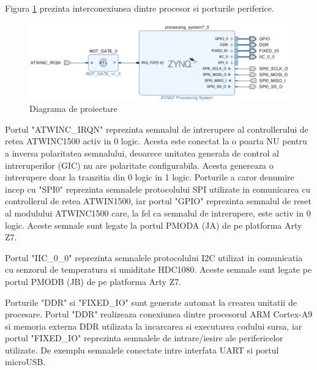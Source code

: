 Figura \ref{fig:PI_ZynqBlockDesign} prezinta interconexiunea dintre procesor si porturile periferice.
\begin{figure}[H]
    \centering
    \includegraphics[scale=0.68]{figs/PI_ZynqBlockDesign.png}
    \caption{Diagrama de proiectare}
    \label{fig:PI_ZynqBlockDesign}
\end{figure}

Portul "ATWINC\_IRQN" reprezinta semnalul de intrerupere al controllerului de retea ATWINC1500 activ in 0 logic. Acesta este conectat la o poarta NU pentru a 
inversa polaritatea semnalului, deoarece unitatea generala de control al intreruperilor (GIC) nu are polaritate configurabila. Acesta genereaza o intrerupere 
doar la tranzitia din 0 logic in 1 logic. Porturile a caror denumire incep cu "SPI0" reprezinta semnalele protocolului SPI utilizate in comunicarea cu controllerul 
de retea ATWIN1500, iar portul "GPIO" reprezinta semnalul de reset al modulului ATWINC1500 care, la fel ca semnalul de intrerupere, este activ in 0 logic. Aceste 
semnale sunt legate la portul PMODA (JA) de pe platforma Arty Z7.

Portul "IIC\_0\_0" reprezinta semnalele protocolului I2C utilizat in comunicatia cu senzorul de temperatura si umiditate HDC1080. Aceste semnale sunt legate pe 
portul PMODB (JB) de pe platforma Arty Z7.

Porturile "DDR" si "FIXED\_IO" sunt generate automat la crearea unitatii de procesare. Portul "DDR" realizeaza conexiunea dintre procesorul ARM Cortex-A9 si memoria 
externa DDR utilizata la incarcarea si executarea codului sursa, iar portul "FIXED\_IO" reprezinta semnalele de intrare/iesire ale perifericelor utilizate. De exemplu 
semnalele conectate intre interfata UART si portul microUSB.


